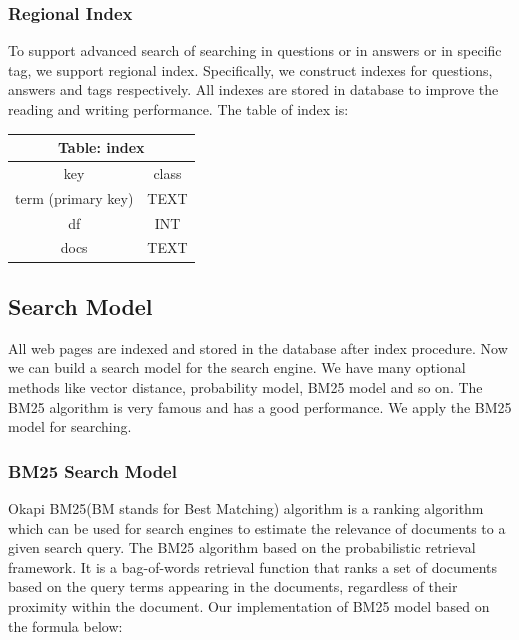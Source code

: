 \documentclass[10pt,journal,compsoc]{IEEEtran}
\begin{document}
\subsubsection{Regional Index}
To support advanced search of searching in questions or in answers or in specific tag, we support regional index. Specifically, we construct indexes for questions, answers and tags respectively. All indexes are stored in database to improve the reading and writing performance. The table of index is:
\begin{table}[H]
\centering
\begin{tabular}{cc}
\toprule
\multicolumn{2}{c}{\textbf{Table: index}} \\
\midrule
key                   & class             \\
\midrule
term (primary key)                    & TEXT               \\
df                   & INT               \\
docs                  & TEXT              \\
\bottomrule
\end{tabular}
\end{table}


\subsection{Search Model}
\label{subsec:search_engine}
All web pages are indexed and stored in the database after index procedure. Now we can build a search model for the search engine. We have many optional methods like vector distance, probability model, BM25 model and so on. The BM25 algorithm is very famous and has a good performance. We apply the BM25 model for searching.

\subsubsection{BM25 Search Model}
Okapi BM25(BM stands for Best Matching) algorithm is a ranking algorithm which can be used for search engines to estimate the relevance of documents to a given search query. The BM25 algorithm based on the probabilistic retrieval framework. It is a bag-of-words retrieval function that ranks a set of documents based on the query terms appearing in the documents, regardless of their proximity within the document. Our implementation of BM25 model based on the formula below:
\end{document}
